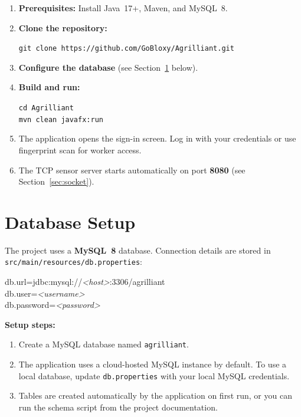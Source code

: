 \documentclass[12pt, a4paper]{report}
\begin{document}
\begin{enumerate}[leftmargin=*, label=\textbf{\arabic*.}]
    \item \textbf{Prerequisites:} Install Java~17+, Maven, and MySQL~8.
    \item \textbf{Clone the repository:}
\begin{tcolorbox}[colback=codebg, colframe=codebg, boxrule=0pt, arc=0pt, left=8pt, right=8pt, top=4pt, bottom=4pt]
\texttt{git clone https://github.com/GoBloxy/Agrilliant.git}
\end{tcolorbox}
    \item \textbf{Configure the database} (see Section~\ref{sec:dbsetup} below).
    \item \textbf{Build and run:}
\begin{tcolorbox}[colback=codebg, colframe=codebg, boxrule=0pt, arc=0pt, left=8pt, right=8pt, top=4pt, bottom=4pt]
\texttt{cd Agrilliant}\\
\texttt{mvn clean javafx:run}
\end{tcolorbox}
    \item The application opens the sign-in screen. Log in with your credentials or use fingerprint scan for worker access.
    \item The TCP sensor server starts automatically on port \textbf{8080} (see Section~\ref{sec:socket}).
\end{enumerate}

\section{Database Setup}\label{sec:dbsetup}

The project uses a \textbf{MySQL~8} database. Connection details are stored in \texttt{src/main/resources/db.properties}:

\begin{tcolorbox}[colback=codebg, colframe=codebg, boxrule=0pt, arc=0pt, left=8pt, right=8pt, top=6pt, bottom=6pt]
\ttfamily\small
db.url=jdbc:mysql://\textit{<host>}:3306/agrilliant\\
db.user=\textit{<username>}\\
db.password=\textit{<password>}
\end{tcolorbox}

\textbf{Setup steps:}
\begin{enumerate}[noitemsep]
    \item Create a MySQL database named \texttt{agrilliant}.
    \item The application uses a cloud-hosted MySQL instance by default. To use a local database, update \texttt{db.properties} with your local MySQL credentials.
    \item Tables are created automatically by the application on first run, or you can run the schema script from the project documentation.
\end{enumerate}
\end{document}
